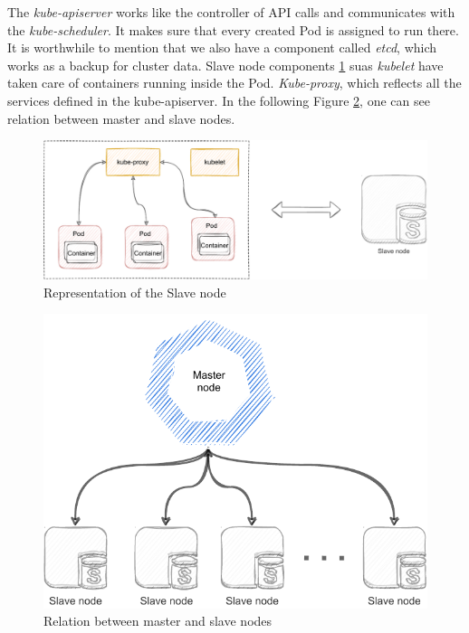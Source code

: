 The \emph{kube-apiserver} works like the controller of API calls and communicates with the \emph{kube-scheduler}.
It makes sure that every created Pod is assigned to run there.
It is worthwhile to mention that we also have a component called \emph{etcd}, which works as a backup for cluster data.
Slave node components \ref{02:fig:slaveNode} suas \emph{kubelet} have taken care of containers running inside the Pod. \emph{Kube-proxy}, which reflects all the services defined in the kube-apiserver.
In the following Figure \ref{02:fig:masterAndSlaveNode}, one can see relation between master and slave nodes.

\begin{figure}[!h]
    \centering
    \includegraphics[scale=0.82]{obrazky-figures/02-preliminaries/01-kubernetes/02-architecture-slave-sketch.pdf}
    \caption{Representation of the Slave node}
    \label{02:fig:slaveNode}
\end{figure}


\begin{figure}[!h]
    \centering
    \includegraphics[scale=0.92]{obrazky-figures/02-preliminaries/01-kubernetes/02-final-architecture-master-slave.pdf}
    \caption{Relation between master and slave nodes}
    \label{02:fig:masterAndSlaveNode}
\end{figure}

